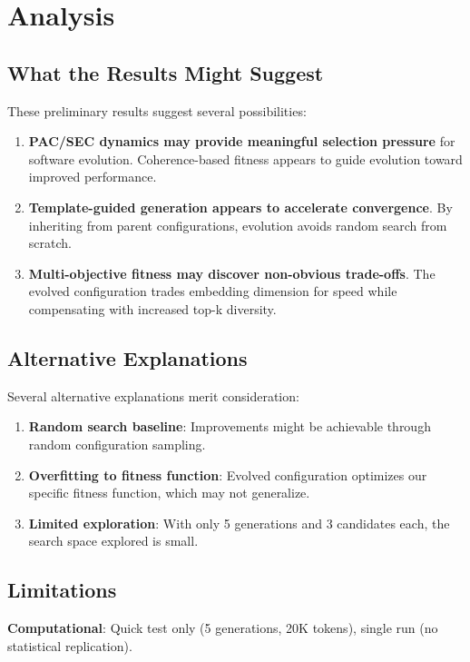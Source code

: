 \documentclass[11pt,a4paper]{article}
\begin{document}
\section{Analysis}

\subsection{What the Results Might Suggest}

These preliminary results suggest several possibilities:

\begin{enumerate}
    \item \textbf{PAC/SEC dynamics may provide meaningful selection pressure} for software evolution. Coherence-based fitness appears to guide evolution toward improved performance.
    \item \textbf{Template-guided generation appears to accelerate convergence}. By inheriting from parent configurations, evolution avoids random search from scratch.
    \item \textbf{Multi-objective fitness may discover non-obvious trade-offs}. The evolved configuration trades embedding dimension for speed while compensating with increased top-k diversity.
\end{enumerate}

\subsection{Alternative Explanations}

Several alternative explanations merit consideration:

\begin{enumerate}
    \item \textbf{Random search baseline}: Improvements might be achievable through random configuration sampling.
    \item \textbf{Overfitting to fitness function}: Evolved configuration optimizes our specific fitness function, which may not generalize.
    \item \textbf{Limited exploration}: With only 5 generations and 3 candidates each, the search space explored is small.
\end{enumerate}

\subsection{Limitations}

\textbf{Computational}: Quick test only (5 generations, 20K tokens), single run (no statistical replication).
\end{document}
